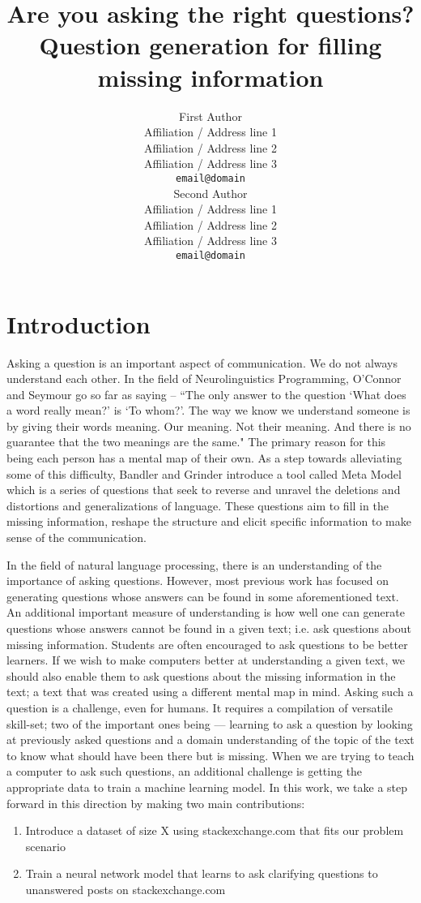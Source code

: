 \documentclass[11pt]{article}
\title{Are you asking the right questions? \\ Question generation for filling missing information}
\author{First Author \\
  Affiliation / Address line 1 \\
  Affiliation / Address line 2 \\
  Affiliation / Address line 3 \\
  {\tt email@domain} \\\And
  Second Author \\
  Affiliation / Address line 1 \\
  Affiliation / Address line 2 \\
  Affiliation / Address line 3 \\
  {\tt email@domain} \\}
\date{}
\begin{document}
\maketitle
\begin{abstract}

\end{abstract}
\section{Introduction}

Asking a question is an important aspect of communication. We do not always understand each other. In the field of Neurolinguistics Programming, O'Connor and Seymour  go so far as saying -- ``The only answer to the question `What does a word really mean?' is `To whom?'. The way we know we understand someone is by giving their words meaning. Our meaning. Not their meaning. And there is no guarantee that the two meanings are the same." The primary reason for this being each person has a mental map of their own. As a step towards alleviating some of this difficulty, Bandler and Grinder  introduce a tool called Meta Model which is a series of questions that seek to reverse and unravel the deletions and distortions and generalizations of language. These questions aim to fill in the missing information, reshape the structure and elicit specific information to make sense of the communication.

In the field of natural language processing, there is an understanding of the importance of asking questions. However, most previous work has focused on generating questions whose answers can be found in some aforementioned text. An additional important measure of understanding is how well one can generate questions whose answers cannot be found in a given text; i.e. ask questions about missing information. Students are often encouraged to ask questions to be better learners. If we wish to make computers better at understanding a given text, we should also enable them to ask questions about the missing information in the text; a text that was created using a different mental map in mind. Asking such a question is a challenge, even for humans. It requires a compilation of versatile skill-set; two of the important ones being --- learning to ask a question by looking at previously asked questions and a domain understanding of the topic of the text to know what should have been there but is missing. When we are trying to teach a computer to ask such questions, an additional challenge is getting the appropriate data to train a machine learning model. In this work, we take a step forward in this direction by making two main contributions:
\begin{enumerate}
\item Introduce a dataset of size X using stackexchange.com that fits our problem scenario
\item Train a neural network model that learns to ask clarifying questions to unanswered posts on stackexchange.com
\end{enumerate}
    
\end{document}
